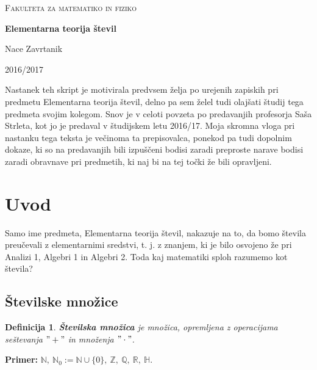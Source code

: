 \documentclass[12pt, a4paper]{article}
\newtheorem{defi}{Definicija}
\newenvironment{prim}[1][]{\par\medskip\noindent \textbf{Primer: }}{\medskip}
\begin{document}
\begin{titlepage}
	\centering
	
	{\scshape\Large Fakulteta za matematiko in fiziko \par}
	\vspace{2cm}

	{\Huge\bfseries Elementarna teorija števil\par}
	\vspace{2cm}
	{\Large Nace Zavrtanik\par}
	
	\vfill

	{\large 2016/2017\par}
\end{titlepage}
\noindent Nastanek teh skript je motivirala predvsem želja po urejenih zapiskih pri predmetu Elementarna teorija števil, delno pa sem želel tudi olajšati študij tega predmeta svojim kolegom. Snov je v celoti povzeta po predavanjih profesorja Saša Strleta, kot jo je predaval v študijskem letu 2016/17. Moja skromna vloga pri nastanku tega teksta je večinoma ta prepisovalca, ponekod pa tudi dopolnim dokaze, ki so na predavanjih bili izpuščeni bodisi zaradi preproste narave bodisi zaradi obravnave pri predmetih, ki naj bi na tej točki že bili opravljeni.

\newpage

	\tableofcontents
	\newpage

\section{Uvod}

Samo ime predmeta, Elementarna teorija števil, nakazuje na to, da bomo števila preučevali z elementarnimi sredstvi, t. j. z znanjem, ki je bilo osvojeno že pri Analizi 1, Algebri 1 in Algebri 2. Toda kaj matematiki sploh razumemo kot števila?

\subsection{Številske množice}

\begin{defi}
\textbf{Številska množica} je množica, opremljena z operacijama seštevanja $"+"$ in množenja $"\cdot "$.
\end{defi}

\begin{prim}
 $\mathbb{N},\ \mathbb{N}_{0}:=\mathbb{N} \cup \{ 0 \},\ \mathbb{Z} ,\ \mathbb{Q} ,\ \mathbb{R} ,\ \mathbb{H}.$
\end{prim}
\end{document}
